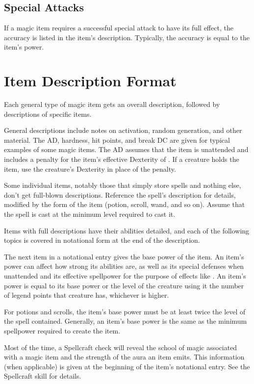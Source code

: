 \subsection{Special Attacks}

If a magic item requires a successful special attack to have its full effect, the accuracy is listed in the item's description.
Typically, the accuracy is equal to the item's power.

\section{Item Description Format}

Each general type of magic item gets an overall description, followed by descriptions of specific items.

General descriptions include notes on activation, random generation, and other material.
The AD, hardness, hit points, and break DC are given for typical examples of some magic items.
The AD assumes that the item is unattended and includes a  penalty for the item's effective Dexterity of .
If a creature holds the item, use the creature's Dexterity in place of the  penalty.

Some individual items, notably those that simply store spells and nothing else, don't get full-blown descriptions.
Reference the spell's description for details, modified by the form of the item (potion, scroll, wand, and so on).
Assume that the spell is cast at the minimum level required to cast it.

Items with full descriptions have their abilities detailed, and each of the following topics is covered in notational form at the end of the description.

 The next item in a notational entry gives the base power of the item.
An item's power can affect how strong its abilities are, as well as its special defenses when unattended and its effective spellpower for the purpose of effects like .
An item's power is equal to its base power or the level of the creature using it \add the number of legend points that creature has, whichever is higher.

For potions and scrolls, the item's base power must be at least twice the level of the spell contained.
Generally, an item's base power is the same as the minimum spellpower required to create the item.

 Most of the time, a Spellcraft check will reveal the school of magic associated with a magic item and the strength of the aura an item emits.
This information (when applicable) is given at the beginning of the item's notational entry.
See the Spellcraft skill for details.

